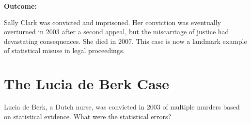 \documentclass[11pt,a4paper]{article}
\begin{document}
\begin{answer}
\vspace{0.3cm}
\textbf{Outcome:}

Sally Clark was convicted and imprisoned. Her conviction was eventually overturned in 2003 after a second appeal, but the miscarriage of justice had devastating consequences. She died in 2007. This case is now a landmark example of statistical misuse in legal proceedings.
\end{answer}

\newpage
\section{The Lucia de Berk Case}

\begin{question}
Lucia de Berk, a Dutch nurse, was convicted in 2003 of multiple murders based on statistical evidence. What were the statistical errors?
\end{question}
\end{document}
